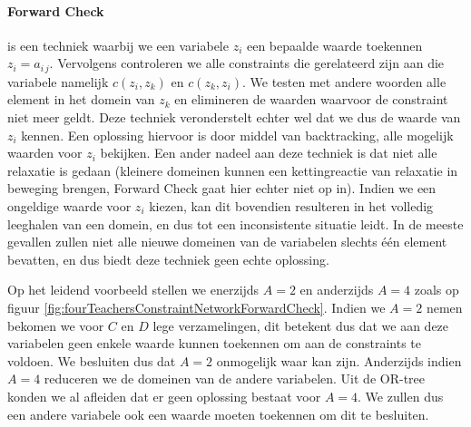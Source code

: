 \paragraph{Forward Check}
 is een techniek waarbij we een variabele $z_i$ een bepaalde waarde toekennen $z_i=a_{i\,j}$. Vervolgens controleren we alle constraints die gerelateerd zijn aan die variabele namelijk $c\left(z_i,z_k\right)$ en $c\left(z_k,z_i\right)$. We testen met andere woorden alle element in het domein van $z_k$ en elimineren de waarden waarvoor de constraint niet meer geldt. Deze techniek veronderstelt echter wel dat we dus de waarde van $z_i$ kennen. Een oplossing hiervoor is door middel van backtracking, alle mogelijk waarden voor $z_i$ bekijken. Een ander nadeel aan deze techniek is dat niet alle relaxatie is gedaan (kleinere domeinen kunnen een kettingreactie van relaxatie in beweging brengen, Forward Check gaat hier echter niet op in). Indien we een ongeldige waarde voor $z_i$ kiezen, kan dit bovendien resulteren in het volledig leeghalen van een domein, en dus tot een inconsistente situatie leidt. In de meeste gevallen zullen niet alle nieuwe domeinen van de variabelen slechts één element bevatten, en dus biedt deze techniek geen echte oplossing.
\begin{leftbar}
Op het leidend voorbeeld stellen we enerzijds $A=2$ en anderzijds $A=4$ zoals op figuur \ref{fig:fourTeachersConstraintNetworkForwardCheck}. Indien we $A=2$ nemen bekomen we voor $C$ en $D$ lege verzamelingen, dit betekent dus dat we aan deze variabelen geen enkele waarde kunnen toekennen om aan de constraints te voldoen. We besluiten dus dat $A=2$ onmogelijk waar kan zijn. Anderzijds indien $A=4$ reduceren we de domeinen van de andere variabelen. Uit de OR-tree konden we al afleiden dat er geen oplossing bestaat voor $A=4$. We zullen dus een andere variabele ook een waarde moeten toekennen om dit te besluiten.
\end{leftbar}
